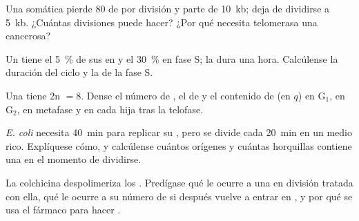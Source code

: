 \begin{exercise}[$\star\star$]\label{exo:b1:replication-mitosis:7}
Una  somática pierde \qty{80}{}  de  por división y
parte de \qty{10}{kb}; deja de dividirse a \qty{5}{kb}. ¿Cuántas divisiones
puede hacer? ¿Por qué necesita telomerasa una  cancerosa?
\end{exercise}

\begin{exercise}[$\star\star$]\label{exo:b1:replication-mitosis:8}
Un  tiene el \qty{5}{\%} de sus  en  y el \qty{30}{\%}
en fase S; la  dura una hora. Calcúlense la duración del ciclo y la
de la fase S.
\end{exercise}

\begin{exercise}[$\star\star$]\label{exo:b1:replication-mitosis:9}
Una  tiene 2n $= 8$. Dense el número de , el de  y
el contenido de  (en $q$) en G$_1$, en G$_2$, en metafase y en cada hija
tras la telofase.
\end{exercise}

\begin{exercise}[$\star\star\star$]\label{exo:b1:replication-mitosis:10}
\emph{E. coli} necesita \qty{40}{min} para replicar su , pero se
divide cada \qty{20}{min} en un medio rico. Explíquese cómo, y calcúlense
cuántos orígenes y cuántas horquillas contiene una  en el momento de
dividirse.
\end{exercise}

\begin{exercise}[$\star\star\star$]\label{exo:b1:replication-mitosis:11}
La colchicina despolimeriza los . Predígase qué le ocurre a una
 en división tratada con ella, qué le ocurre a su número de 
si después vuelve a entrar en , y por qué se usa el fármaco para
hacer .
\end{exercise}

